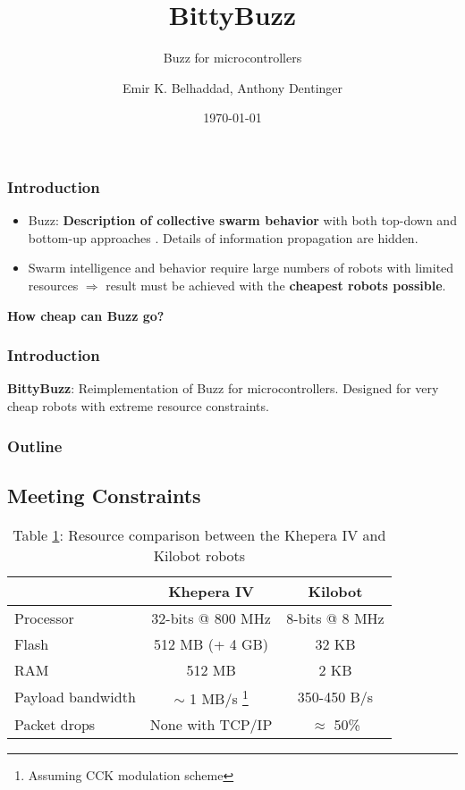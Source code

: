 \documentclass{beamer}
\title{BittyBuzz}
\subtitle{Buzz for microcontrollers}
\author{Emir K. Belhaddad, Anthony Dentinger}
\date{\today}
\begin{document}
	\begin{frame}
		\titlepage
	\end{frame}
	\begin{frame}
		\frametitle{Introduction}
		\begin{itemize}
			\item Buzz: \textbf{Description of collective swarm behavior} with both top-down and bottom-up approaches \cite{buzz_arxiv}. Details of information propagation are hidden.
			\item Swarm intelligence and behavior require large numbers of robots with limited resources $\Rightarrow$ result must be achieved with the \textbf{cheapest robots possible}.
		\end{itemize}

		\centering \Large
		\textbf{How cheap can Buzz go?}
	\end{frame}
	\begin{frame}
		\frametitle{Introduction}
		\textbf{BittyBuzz}: Reimplementation of Buzz for microcontrollers. Designed for very cheap robots with extreme resource constraints.
	\end{frame}
	\begin{frame}
		\frametitle{Outline}
		\tableofcontents
	\end{frame}
	\begin{frame}
		\section{Meeting Constraints}
		\begin{table}
			\begin{tabular}{l|c|c}
				& Khepera IV        & Kilobot\\
				\hline
				Processor         & 32-bits @ 800 MHz & 8-bits @ 8 MHz\\
				Flash             & 512 MB (+ 4 GB)   & 32 KB\\
				RAM               & 512 MB            & 2 KB\\
				Payload bandwidth & $\sim$ 1 MB/s \footnote{Assuming CCK modulation scheme} \cite{khepera_wifi}  & 350-450 B/s\\
				Packet drops      & None with TCP/IP  & $\approx$ 50\%
			\end{tabular}
			\caption{
				\label{table:khepera kilobot comparison}Table \ref{table:khepera kilobot comparison}: Resource comparison between the Khepera IV and Kilobot robots \cite{khepera_specs}}
		\end{table}
	\end{frame}
\end{document}
